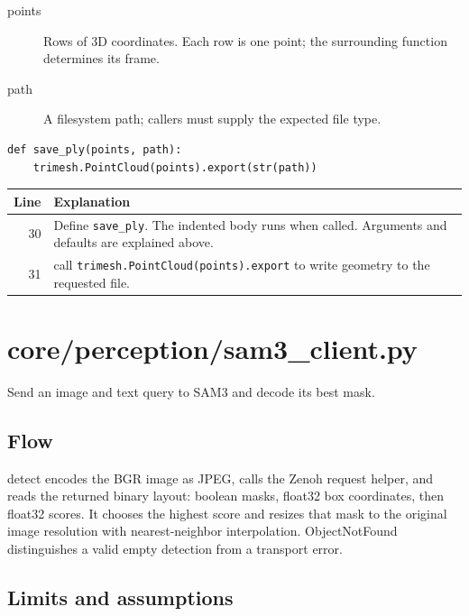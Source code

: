 \documentclass[11pt,a4paper]{book}
\begin{document}
\begin{description}
\item[points] Rows of 3D coordinates. Each row is one point; the surrounding function determines its frame.
\item[path] A filesystem path; callers must supply the expected file type.
\end{description}

\begin{lstlisting}[firstnumber=30]
def save_ply(points, path):
    trimesh.PointCloud(points).export(str(path))
\end{lstlisting}

\begin{longtable}{r p{}}

\textbf{Line} & \textbf{Explanation} \\ \hline \endhead

30 & Define \texttt{save\_ply}. The indented body runs when called. Arguments and defaults are explained above. \\

31 & call \texttt{trimesh.PointCloud(points).export} to write geometry to the requested file. \\

\end{longtable}

\chapter{core/perception/sam3\_client.py}

Send an image and text query to SAM3 and decode its best mask.

\section*{Flow}

detect encodes the BGR image as JPEG, calls the Zenoh request helper, and reads the returned binary layout: boolean masks, float32 box coordinates, then float32 scores. It chooses the highest score and resizes that mask to the original image resolution with nearest-neighbor interpolation. ObjectNotFound distinguishes a valid empty detection from a transport error.

\section*{Limits and assumptions}
\end{document}
